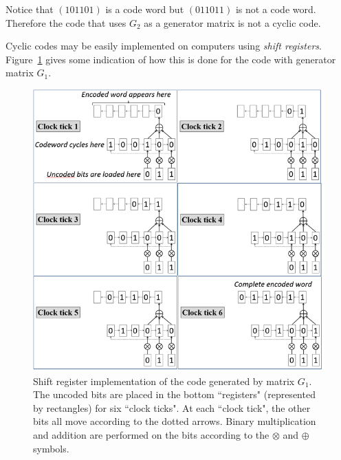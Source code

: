 Notice that $(101101)$ is a code word but $(011011)$ is not a code word.  Therefore the code that uses $G_2$ as a generator matrix is not a cyclic code.

Cyclic codes may be easily implemented on computers using \emph{shift registers}. Figure~\ref{fig:shift} gives some indication of how this is done for the code with generator matrix $G_1$.
\begin{figure}[h]
\begin{center}
\includegraphics[width=5 in]{images/Shiftregister2.png}
\end{center}
\caption{\label{fig:shift}Shift register implementation of the code generated by matrix $G_1$. The uncoded bits are placed in the bottom ``registers" (represented by rectangles) for six ``clock ticks". At each ``clock tick", the other bits all move according to the dotted arrows. Binary multiplication and addition are performed on the bits according to the $\otimes$ and $\oplus$ symbols. }
\end{figure}

